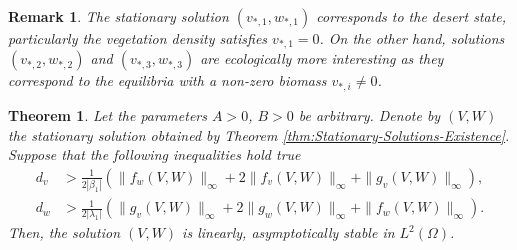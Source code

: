 \documentclass[11pt, a4paper]{article}
\theoremstyle{break}
\newtheorem{thm}{Theorem}[section]
\theoremstyle{break}
\theoremstyle{break}
\theoremstyle{break}
\newtheorem{rem}{Remark}[section]
\theoremstyle{break}
\theoremstyle{break}
\theoremstyle{break}
\begin{document}
\begin{rem}
    \label{rem:classification_steady_states}
    The stationary solution $(v_{*,1},w_{*,1})$ corresponds to the desert state, particularly the vegetation density satisfies $v_{*,1} = 0$. On the other hand, solutions $(v_{*,2}, w_{*,2})$ and $(v_{*,3}, w_{*,3})$ are ecologically more interesting as they correspond to the equilibria with a non-zero biomass $v_{*,i} \neq 0$.
\end{rem}

\begin{thm}
    \label{thm:Stationary-Solutions-Stability}
    Let the parameters $A > 0$, $B > 0$ be arbitrary. Denote by $(V, W)$ the stationary solution obtained by Theorem \ref{thm:Stationary-Solutions-Existence}. Suppose that the following inequalities hold true
    \begin{align}
        d_v &> \frac{1}{2|\beta_1|} \left( 
        \|f_w(V,W)\|_\infty + 2 \| f_v(V, W) \|_\infty + \|g_v(V,W)\|_\infty
        \right), \label{eq:assumption_stability_v} \\
        d_w &> \frac{1}{ 2|\lambda_1|} \left( 
        \|g_v(V,W)\|_\infty + 2 \| g_w(V, W) \|_\infty + \|f_w(V,W)\|_\infty
        \right). \label{eq:assumption_stability_w}
    \end{align} 
    Then, the solution $(V, W)$ is linearly, asymptotically stable in $L^2(\Omega)$.
\end{thm}
\end{document}
